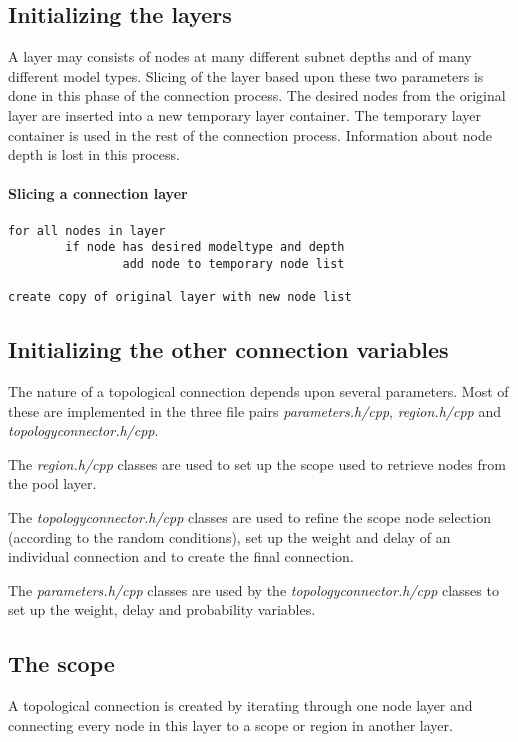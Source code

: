 \documentclass{article}
\begin{document}
\subsection{Initializing the layers}

A layer may consists of nodes at many different subnet depths and of many different model types. Slicing of the layer based upon these two parameters is done in this phase of the connection process. The desired nodes from the original layer are inserted into a new temporary layer container. The temporary layer container is used in the rest of the connection process. Information about node depth is lost in this process. 

\paragraph{Slicing a connection layer}
\begin{verbatim}
for all nodes in layer
        if node has desired modeltype and depth
                add node to temporary node list

create copy of original layer with new node list
\end{verbatim}

\subsection{Initializing the other connection variables}

The nature of a topological connection depends upon several parameters. Most of these are implemented in the three file pairs \emph{parameters.h/cpp}, \emph{region.h/cpp} and \emph{topologyconnector.h/cpp}.

The \emph{region.h/cpp} classes are used to set up the scope used to retrieve nodes from the pool layer.

The \emph{topologyconnector.h/cpp} classes are used to refine the scope node selection (according to the random conditions), set up the weight and delay of an individual connection and to create the final connection.

The \emph{parameters.h/cpp} classes are used by the \emph{topologyconnector.h/cpp} classes to set up the weight, delay and probability variables. 

\subsection{The scope}

A topological connection is created by iterating through one node layer and connecting every node in this layer to a scope or region in another layer.
\end{document}
